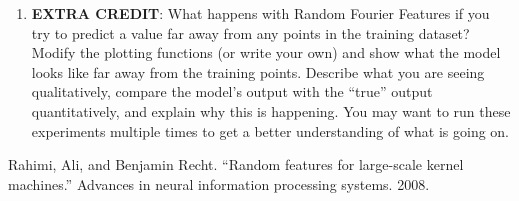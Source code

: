 \documentclass{article} %
\begin{document}
\begin{enumerate}
\begin{enumerate}
		\item \textbf{EXTRA CREDIT}: What happens with Random Fourier Features if you try to predict a value far away from 
		any points in the training dataset? Modify the plotting functions (or write your own) and show what the model looks 
		like far away from the training points. Describe what you are seeing qualitatively, compare the model's output with 
		the ``true'' output quantitatively, and explain why this is happening. You may want to run these experiments multiple 
		times to get a better understanding of what is going on.
	\end{enumerate}
\end{enumerate}

\begin{thebibliography}{1}

 Rahimi, Ali, and Benjamin Recht. ``Random features for large-scale kernel 
machines.'' Advances in neural information processing systems. 2008.
\end{thebibliography}
\end{document}

